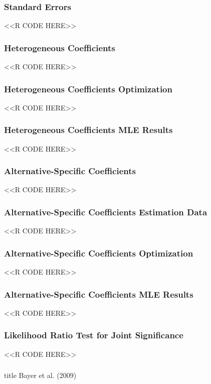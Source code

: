 \documentclass{beamer}
\begin{document}
\begin{frame}[fragile]\frametitle{Standard Errors}
    <<R CODE HERE>>
\end{frame}

\begin{frame}[fragile]\frametitle{Heterogeneous Coefficients}
    \vspace{1ex}
    <<R CODE HERE>>
\end{frame}

\begin{frame}[fragile]\frametitle{Heterogeneous Coefficients Optimization}
    <<R CODE HERE>>
\end{frame}

\begin{frame}[fragile]\frametitle{Heterogeneous Coefficients MLE Results}
    <<R CODE HERE>>
\end{frame}

\begin{frame}[fragile]\frametitle{Alternative-Specific Coefficients}
    <<R CODE HERE>>
\end{frame}

\begin{frame}[fragile]\frametitle{Alternative-Specific Coefficients Estimation Data}
    <<R CODE HERE>>
\end{frame}

\begin{frame}[fragile]\frametitle{Alternative-Specific Coefficients Optimization}
    <<R CODE HERE>>
\end{frame}

\begin{frame}[fragile]\frametitle{Alternative-Specific Coefficients MLE Results}
    <<R CODE HERE>>
\end{frame}

\begin{frame}[fragile]\frametitle{Likelihood Ratio Test for Joint Significance}
    <<R CODE HERE>>
\end{frame}

\begin{frame}\frametitle{}
    \vfill
    \centering
    \begin{beamercolorbox}[center]{title}
        \Large Bayer et al. (2009)
    \end{beamercolorbox}
    \vfill
\end{frame}
\end{document}
